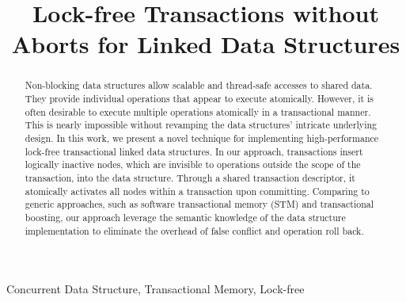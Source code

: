 \documentclass[10pt,conference,compsocconf]{IEEEtran}
\begin{document}
\title{Lock-free Transactions without Aborts for Linked Data Structures}

\author{
}

\maketitle

\begin{abstract}
    Non-blocking data structures allow scalable and thread-safe accesses to shared data. 
    They provide individual operations that appear to execute atomically.
    However, it is often desirable to execute multiple operations atomically in a transactional manner.
    This is nearly impossible without revamping the data structures' intricate underlying design.
    In this work, we present a novel technique for implementing high-performance lock-free transactional linked data structures.
    In our approach, transactions insert logically inactive nodes, which are invisible to operations outside the scope of the transaction, into the data structure.
    Through a shared transaction descriptor, it atomically activates all nodes within a transaction upon committing.
    Comparing to generic approaches, such as software transactional memory (STM) and transactional boosting, our approach leverage the semantic knowledge of the data structure implementation to eliminate the overhead of false conflict and operation roll back.
\end{abstract}

\begin{IEEEkeywords}
    Concurrent Data Structure, Transactional Memory, Lock-free 
\end{IEEEkeywords}
\end{document}
